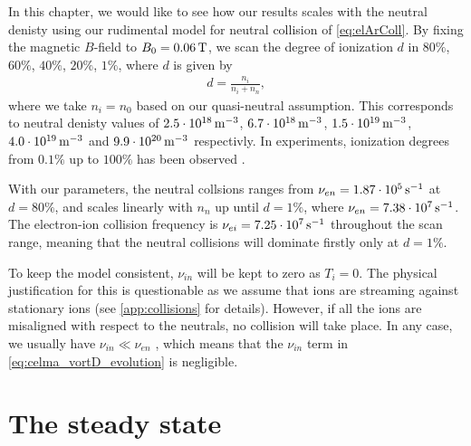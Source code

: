 In this chapter, we would like to see how our results scales with the neutral denisty using our rudimental model for neutral collision of \cref{eq:elArColl}.
By fixing the magnetic $B$-field to $B_0=0.06\, \text{T}$, we scan the degree of ionization $d$ in $80\%$, $60\%$, $40\%$, $20\%$, $1\%$, where $d$ is given by
%
\begin{align*}
    d = \frac{n_i}{n_i+n_n},
\end{align*}
%
where we take $n_i=n_0$ based on our quasi-neutral assumption.
This corresponds to neutral denisty values of
$2.5\cdot10^{18}\, \text{m}^{-3}$,
$6.7\cdot10^{18}\, \text{m}^{-3}$,
$1.5\cdot10^{19}\, \text{m}^{-3}$,
$4.0\cdot10^{19}\, \text{m}^{-3}$ and
$9.9\cdot10^{20}\, \text{m}^{-3}$
respectivly.
In experiments, ionization degrees from $0.1\%$ up to $100\%$ has been observed \cite{Schroder2003Phd}.

With our parameters, the neutral collsions ranges from $\nu_{en}=1.87\cdot10^{5}\, \text{s}^{-1}$ at $d=80\%$, and scales linearly with $n_n$ up until $d=1\%$, where $\nu_{en}=7.38\cdot10^7\, \text{s}^{-1}$.
The electron-ion collision frequency is $\nu_{ei}=7.25\cdot10^7 \, \text{s}^{-1}$ throughout the scan range, meaning that the neutral collisions will dominate firstly only at $d=1\%$.

To keep the model consistent, $\nu_{in}$ will be kept to zero as $T_i=0$.
The physical justification for this is questionable as we assume that ions are streaming against stationary ions (see \cref{app:collisions} for details).
However, if all the ions are misaligned with respect to the neutrals, no collision will take place.
In any case, we usually have $\nu_{in}\ll\nu_{en}$ \cite{Schroder2003Phd}, which means that the $\nu_{in}$ term in \cref{eq:celma_vortD_evolution} is negligible.

\section{The steady state}

